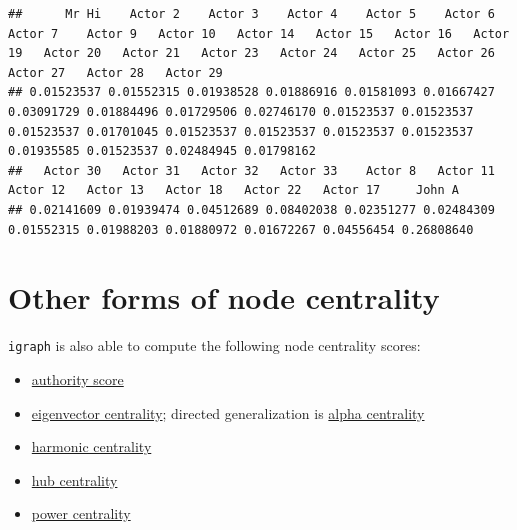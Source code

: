 \documentclass[
]{book}
\newenvironment{Shaded}{\begin{snugshade}}{\end{snugshade}}
\newcommand{\AttributeTok}[1]{\textcolor[rgb]{0.13,0.29,0.53}{#1}}
\newcommand{\CommentTok}[1]{\textcolor[rgb]{0.56,0.35,0.01}{\textit{#1}}}
\newcommand{\FunctionTok}[1]{\textcolor[rgb]{0.13,0.29,0.53}{\textbf{#1}}}
\newcommand{\NormalTok}[1]{#1}
\newcommand{\SpecialCharTok}[1]{\textcolor[rgb]{0.81,0.36,0.00}{\textbf{#1}}}
\providecommand{\tightlist}{%
  \setlength{\itemsep}{0pt}\setlength{\parskip}{0pt}}
\begin{document}
\begin{Shaded}
\end{Shaded}

\begin{verbatim}
##      Mr Hi    Actor 2    Actor 3    Actor 4    Actor 5    Actor 6    Actor 7    Actor 9   Actor 10   Actor 14   Actor 15   Actor 16   Actor 19   Actor 20   Actor 21   Actor 23   Actor 24   Actor 25   Actor 26   Actor 27   Actor 28   Actor 29 
## 0.01523537 0.01552315 0.01938528 0.01886916 0.01581093 0.01667427 0.03091729 0.01884496 0.01729506 0.02746170 0.01523537 0.01523537 0.01523537 0.01701045 0.01523537 0.01523537 0.01523537 0.01523537 0.01935585 0.01523537 0.02484945 0.01798162 
##   Actor 30   Actor 31   Actor 32   Actor 33    Actor 8   Actor 11   Actor 12   Actor 13   Actor 18   Actor 22   Actor 17     John A 
## 0.02141609 0.01939474 0.04512689 0.08402038 0.02351277 0.02484309 0.01552315 0.01988203 0.01880972 0.01672267 0.04556454 0.26808640
\end{verbatim}

\begin{Shaded}
\end{Shaded}

\section{Other forms of node centrality}\label{other-forms-of-node-centrality}

\texttt{igraph} is also able to compute the following node centrality scores:

\begin{itemize}
\tightlist
\item
  \href{https://igraph.org/r/doc/authority_score.html}{authority score}
\item
  \href{https://igraph.org/r/doc/eigen_centrality.html}{eigenvector centrality}; directed generalization is \href{https://igraph.org/r/doc/alpha_centrality.html}{alpha centrality}
\item
  \href{https://igraph.org/r/doc/harmonic_centrality.html}{harmonic centrality}
\item
  \href{https://igraph.org/r/doc/hub_score.html}{hub centrality}
\item
  \href{https://igraph.org/r/doc/power_centrality.html}{power centrality}
\end{itemize}
\end{document}
